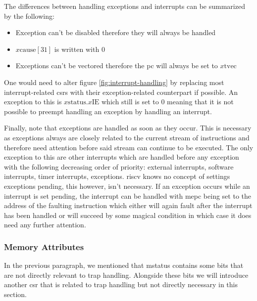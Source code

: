 The differences between handling exceptions and interrupts can be summarized by the following:
\begin{itemize}
    \item Exception can't be disabled therefore they will always be handled
    \item $ x\text{cause}[31] $ is written with $ 0 $
    \item Exceptions can't be vectored therefore the \gls{pc} will always be set to $ x\text{tvec} $
\end{itemize}

One would need to alter figure \ref{fig:interrupt-handling} by replacing most interrupt-related \glspl{csr} with their exception-related counterpart if possible.
An exception to this is $ x\text{status}.x\text{IE} $ which still is set to 0 meaning that it is not possible to preempt handling an exception by handling an interrupt.

Finally, note that exceptions are handled as soon as they occur.
This is necessary as exceptions always are closely related to the current stream of instructions and therefore need attention before said stream can continue to be executed.
The only exception to this are other interrupts which are handled before any exception with the following decreasing order of priority: external interrupts, software interrupts, timer interrupts, exceptions.
\gls{riscv} knows no concept of settings exceptions pending, this however, isn't necessary.
If an exception occurs while an interrupt is set pending, the interrupt can be handled with \gls{mepc} being set to the address of the faulting instruction which either will again fault after the interrupt has been handled or will succeed by some magical condition in which case it does need any further attention.


\subsubsection{Memory Attributes}
\label{sec:memory-attrs}

In the previous paragraph, we mentioned that \gls{mstatus} contains some bits that are not directly relevant to trap handling.
Alongside these bits we will introduce another \gls{csr} that is related to trap handling but not directly necessary in this section.


